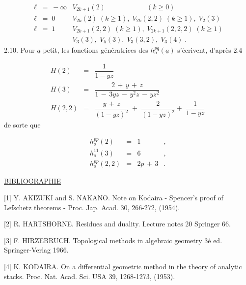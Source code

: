 
\begin{equation*}
\begin{array}{ll}
\ell \;=\; -\infty & V_{2k+1}(2) \qquad\qquad\qquad (k \geq 0) \\[2ex]
\ell \;=\; 0 & V_{2k}(2) \; (k \geq 1), \; V_{2k}(2,2) \; (k \geq 1), \; V_2(3) \\[2ex]
\ell \;=\; 1 & V_{2k+1}(2,2) \; (k \geq 1), \; V_{2k+1}(2,2,2) \; (k \geq 1) \\
& V_3(3), \; V_5(3), \; V_3(3,2), \; V_3(4) \; .
\end{array}
\end{equation*}
2.10. \quad Pour $\underline{a}$ petit, les fonctions génératrices des $h_o^{pq}(\underline{a})$ s'écrivent, d'après 2.4

\begin{equation*}
\begin{array}{rcl}
H(2) & = & \dfrac{1}{1-yz} \\[3ex]
H(3) & = & \dfrac{2 \, + \, y \, + \, z}{1 \, - \, 3yz \, - \, y^2 z \, - \, yz^2} \\[3ex]
H(2,2) & = & \dfrac{y \, + \, z}{(1-yz)^2} \; + \; \dfrac{2}{(1-yz)^2} + \; \dfrac{1}{1-yz}
\end{array}
\end{equation*}
de sorte que

\begin{equation*}
\begin{array}{rcll}
h_o^{pp}(2) & = & 1 & , \\[2ex]
h_o^{11}(3) & = & 6 & , \\[2ex]
h_o^{pp}(2,2) & = & 2p \, + \, 3 & .
\end{array}
\end{equation*}



\underline{BIBLIOGRAPHIE}

[1] Y. AKIZUKI and S. NAKANO. Note on Kodaira - Spencer's proof of Lefschetz theorems - Proc. Jap. Acad. 30, 266-272, (1954).

[2] R. HARTSHORNE. Residues and duality. Lecture notes 20 Springer 66.

[3] F. HIRZEBRUCH. Topological methods in algebraic geometry 3é ed. Springer-Verlag 1966.

[4] K. KODAIRA. On a differential geometric method in the theory of analytic stacks. Proc. Nat. Acad. Sci. USA 39, 1268-1273, (1953).

